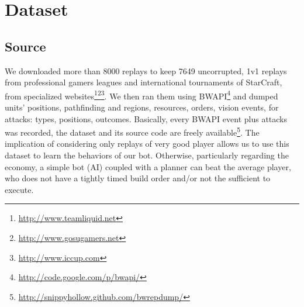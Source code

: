 \section{Dataset}
\label{sec:dataset}
\subsection{Source}
We downloaded more than 8000 replays to keep 7649 uncorrupted, 1v1 replays from professional gamers leagues and international tournaments of StarCraft, from specialized websites\footnote{\url{http://www.teamliquid.net}}\footnote{\url{http://www.gosugamers.net}}\footnote{\url{http://www.iccup.com}}. We then ran them using BWAPI\footnote{\url{http://code.google.com/p/bwapi/}} and dumped units' positions, pathfinding and regions, resources, orders, vision events, for attacks: types, positions, outcomes. Basically, every BWAPI event plus attacks was recorded, the dataset and its source code are freely available\footnote{\url{http://snippyhollow.github.com/bwrepdump/}}. 
The implication of considering only replays of very good player allows us to use this dataset to learn the behaviors of our bot. Otherwise, particularly regarding the economy, a simple bot (AI) coupled with a planner can beat the average player, who does not have a tightly timed build order and/or not the sufficient  to execute. %


